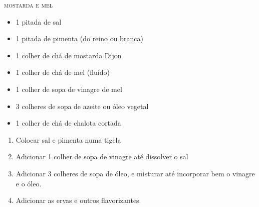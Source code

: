 {	\textsc{mostarda e mel}
	\begin{itemize}
		\item 1 pitada de sal
		\item 1 pitada de pimenta (do reino ou branca)
		\item 1 colher de chá de mostarda Dijon
		\item 1 colher de chá de mel (fluído)
		\item 1 colher de sopa de vinagre de mel
		\item 3 colheres de sopa de azeite ou óleo vegetal
		\item 1 colher de chá de chalota cortada
	\end{itemize}
}
{
	\begin{enumerate}
		\item Colocar sal e pimenta numa tigela
		\item Adicionar 1 colher de sopa de vinagre até dissolver o sal
		\item Adicionar 3 colheres de sopa de óleo, e misturar até incorporar bem o
		      vinagre e o óleo.
		\item Adicionar as ervas e outros flavorizantes.
	\end{enumerate} }

